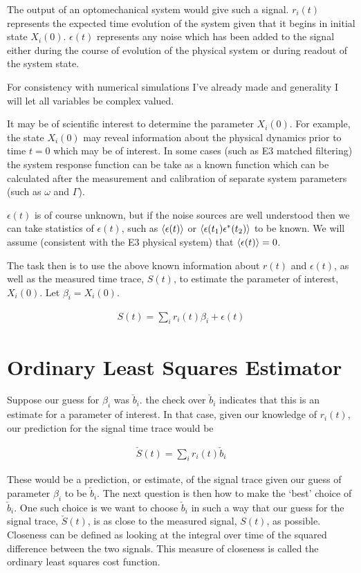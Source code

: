 \documentclass[12pt]{article}
\begin{document}
The output of an optomechanical system would give such a signal. $r_i(t)$ represents the expected time evolution of the system given that it begins in initial state $X_i(0)$. $\epsilon(t)$ represents any noise which has been added to the signal either during the course of evolution of the physical system or during readout of the system state.

For consistency with numerical simulations I've already made and generality I will let all variables be complex valued.

It may be of scientific interest to determine the parameter $X_i(0)$. For example, the state $X_i(0)$ may reveal information about the physical dynamics prior to time $t=0$ which may be of interest. In some cases (such as E3 matched filtering) the system response function can be take as a known function which can be calculated after the measurement and calibration of separate system parameters (such as $\omega$ and $\Gamma$).

$\epsilon(t)$ is of course unknown, but if the noise sources are well understood then we can take statistics of $\epsilon(t)$, such as $\Braket{\epsilon(t)}$ or $\Braket{\epsilon(t_1)\epsilon^*(t_2)}$ to be known. We will assume (consistent with the E3 physical system) that $\Braket{\epsilon(t)} = 0$.

The task then is to use the above known information about $r(t)$ and $\epsilon(t)$, as well as the measured time trace, $S(t)$, to estimate the parameter of interest, $X_i(0)$. Let $\beta_i = X_i(0)$.

\begin{align}
S(t) = \sum_i r_i(t) \beta_i + \epsilon(t)
\end{align}

\section{Ordinary Least Squares Estimator}

Suppose our guess for $\beta_i$ was $\check{b}_i$. the check over $\check{b}_i$ indicates that this is an estimate for a parameter of interest. In that case, given our knowledge of $r_i(t)$, our prediction for the signal time trace would be

\begin{align}
\check{S}(t) = \sum_i r_i(t) \check{b}_i
\end{align}

These would be a prediction, or estimate, of the signal trace given our guess of parameter $\beta_i$ to be $\check{b}_i$. The next question is then how to make the `best' choice of $\check{b}_i$. One such choice is we want to choose $\check{b}_i$ in such a way that our guess for the signal trace, $\check{S}(t)$, is as close to the measured signal, $S(t)$, as possible. Closeness can be defined as looking at the integral over time of the squared difference between the two signals. This measure of closeness is called the ordinary least squares cost function.
\end{document}

